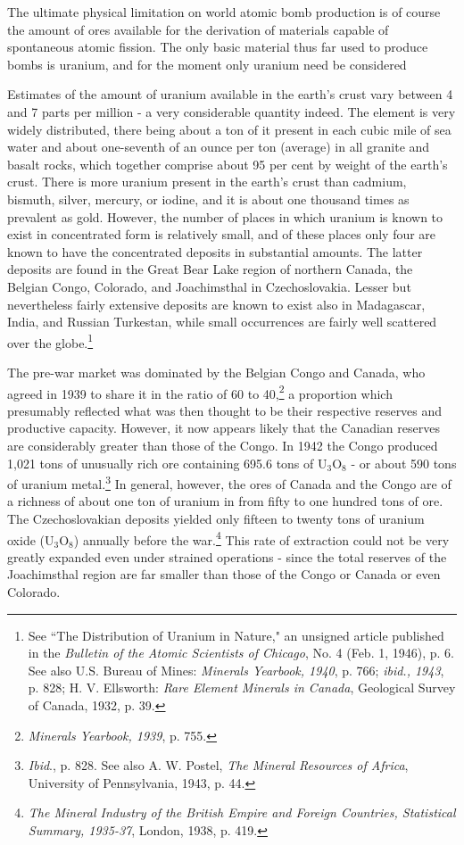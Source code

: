 The ultimate physical limitation on world atomic bomb production is of course the amount of ores available for the derivation of materials capable of spontaneous atomic fission. The only basic material thus far used to produce bombs is uranium, and for the moment only uranium need be considered

Estimates of the amount of uranium available in the earth's crust vary between 4 and 7 parts per million - a very considerable quantity indeed. The element is very widely distributed, there being about a ton of it present in each cubic mile of sea water and about one-seventh of an ounce per ton (average) in all granite and basalt rocks, which together comprise about 95 per cent by weight of the earth's crust. There is more uranium present in the earth's crust than cadmium, bismuth, silver, mercury, or iodine, and it is about one thousand times as prevalent as gold. However, the number of places in which uranium is known to exist in concentrated form is relatively small, and of these places only four are known to have the concentrated deposits in substantial amounts. The latter deposits are found in the Great Bear Lake region of northern Canada, the Belgian Congo, Colorado, and Joachimsthal in Czechoslovakia. Lesser but nevertheless fairly extensive deposits are known to exist also in Madagascar, India, and Russian Turkestan, while small occurrences are fairly well scattered over the globe.\footnote{See ``The Distribution of Uranium in Nature," an unsigned article published in the \textit{Bulletin of the Atomic Scientists of Chicago}, No. 4 (Feb. 1, 1946), p. 6. See also U.S. Bureau of Mines: \textit{Minerals Yearbook, 1940}, p. 766; \textit{ibid., 1943}, p. 828; H. V. Ellsworth: \textit{Rare Element Minerals in Canada}, Geological Survey of Canada, 1932, p. 39.}

The pre-war market was dominated by the Belgian Congo and Canada, who agreed in 1939 to share it in the ratio of 60 to 40,\footnote{\textit{Minerals Yearbook, 1939}, p. 755.} a proportion which presumably reflected what was then thought to be their respective reserves and productive capacity. However, it now appears likely that the Canadian reserves are considerably greater than those of the Congo. In 1942 the Congo produced 1,021 tons of unusually rich ore containing 695.6 tons of U$_3$O$_8$ - or about 590 tons of uranium metal.\footnote{\textit{Ibid}., p. 828. See also A. W. Postel, \textit{The Mineral Resources of Africa}, University of Pennsylvania, 1943, p. 44.} In general, however, the ores of Canada and the Congo are of a richness of about one ton of uranium in from fifty to one hundred tons of ore. The Czechoslovakian deposits yielded only fifteen to twenty tons of uranium oxide (U$_3$O$_8$) annually before the war.\footnote{\textit{The Mineral Industry of the British Empire and Foreign Countries, Statistical Summary, 1935-37}, London, 1938, p. 419.} This rate of extraction could not be very greatly expanded even under strained operations - since the total reserves of the Joachimsthal region are far smaller than those of the Congo or Canada or even Colorado.

